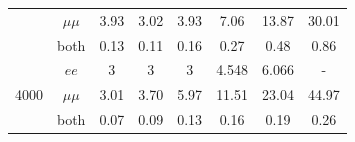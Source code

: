 \documentclass[12pt,a4paper]{amsart}
\begin{document}
\begin{table}[]
\begin{tabular}{cc|cccccc}
                                                              & $\mu\mu$ & 3.93     & 3.02       & 3.93       & 7.06   & 13.87      & 30.01      \\
                                                              & both     & 0.13     & 0.11       & 0.16       & 0.27   & 0.48       & 0.86       \\ \hline
\multirow{3}{*}{4000}                                         & $ee$     & 3        & 3          & 3          & 4.548  & 6.066      & -          \\
                                                              & $\mu\mu$ & 3.01     & 3.70       & 5.97       & 11.51  & 23.04      & 44.97      \\
                                                              & both     & 0.07     & 0.09       & 0.13       & 0.16   & 0.19       & 0.26       \\ \hline\hline
\end{tabular}
\end{table}
\end{document}

